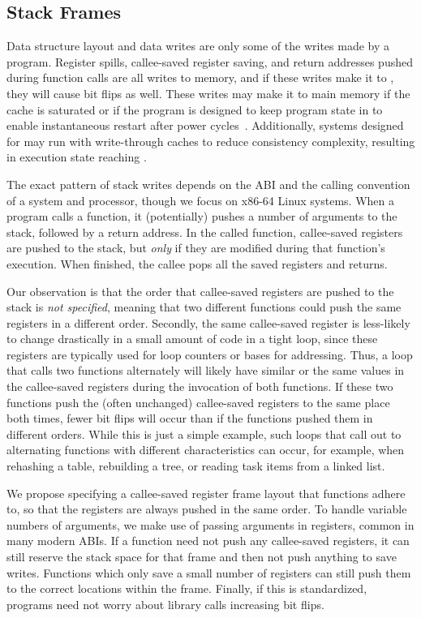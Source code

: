 \subsection{Stack Frames}
\label{sec:stack}

Data structure layout and data writes are only some of the writes made by a
program. Register spills, callee-saved register saving,
and return addresses pushed during function calls are all writes to memory, and
if these writes make it to \NVM, they will cause bit flips as well. These writes
may make it to main memory if the cache is saturated or if the program is
designed to keep program state in \NVM to enable instantaneous restart after
power cycles~\cite{narayanan:asplos12}. Additionally, systems designed for \NVM may run with write-through
caches to reduce consistency complexity, resulting in execution state reaching
\NVM.

The exact pattern of stack writes depends on the ABI and the calling convention of a system and
processor, though we focus on x86-64 Linux systems. When a program calls a function, it
(potentially) pushes a number of arguments to the stack, followed by a return address.  In the
called function, callee-saved registers are pushed to the stack, but \emph{only} if they are modified
during that function's execution. When finished, the callee pops all the saved registers and
returns.

Our observation is that the order that callee-saved registers are pushed to the
stack is \textit{not specified}, meaning that two different functions could push
the same registers in a different order. Secondly, the same callee-saved register
is less-likely to change drastically in a small amount of code in a tight loop,
since these registers are typically used for loop counters or bases for
addressing. Thus, a loop that calls two functions alternately will likely have
similar or the same values in the callee-saved registers during the invocation
of both functions.
If these two functions push the (often unchanged)
callee-saved registers to the same place both times, fewer bit
flips will occur than if the functions pushed them in different orders.
While this is just a simple example,
such loops that call out to alternating functions with different characteristics can occur, for
example, when rehashing a table, rebuilding a tree, or reading task items from a linked
list.

We propose specifying a callee-saved register frame layout that functions adhere
to, so that the registers are always pushed in the same order. To handle
variable numbers of arguments, we make use of passing arguments in registers,
common in many modern ABIs. If a function
need not push any callee-saved registers, it can still reserve the stack space
for that frame and then not push anything to save writes. Functions which only
save a small number of registers can still push them to the correct locations
within the frame. Finally, if this is standardized, programs need not worry
about library calls increasing bit flips.

